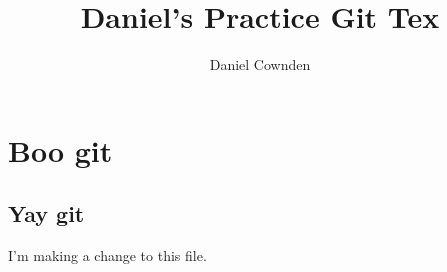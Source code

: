 \documentclass[11pt]{amsart}
\title{Daniel's Practice Git Tex}
\author{Daniel Cownden}
\begin{document}
\maketitle
\section{Boo git}
\subsection{Yay git}

I'm making a change to this file.
\end{document}
